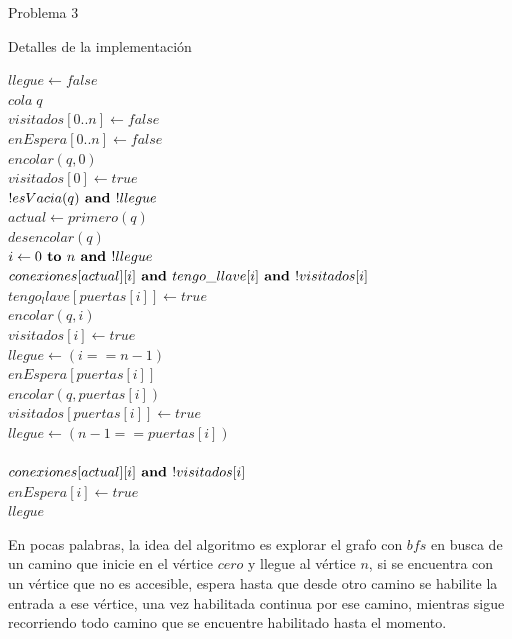 \begin{section}{Problema 3}
\begin{subsection}{Detalles de la implementación}
		\begin{pseudo}
		\tab $llegue \leftarrow false$\\
		\tab $cola\; q$\\
		\tab $visitados[0..n] \leftarrow false$\\ 
		\tab $enEspera[0..n] \leftarrow false$\\ 
		\tab $encolar(q,0)$\\
		\tab $visitados[0] \leftarrow true$\\
		\tab \WHILE $!esVacia(q) \textbf{ and } !llegue$\\
		\tab \tab $actual \leftarrow primero(q)$\\
		\tab \tab $desencolar(q)$\\
		\tab \tab \FOR $ i\leftarrow0 \textbf{ to } n \textbf{ and } !llegue$\\
		\tab \tab \tab \IF	$conexiones[actual][i] \textbf{ and } tengo\_llave[i] \textbf{ and } !visitados[i]$\\
		\tab \tab \tab \tab	$tengo_llave[puertas[i]] \leftarrow true$\\
		\tab \tab \tab \tab	$encolar(q,i)$\\
		\tab \tab \tab \tab	$visitados[i] \leftarrow true$\\
		\tab \tab \tab \tab	$llegue \leftarrow (i == n-1)$\\
		\tab \tab \tab \tab \IF	$enEspera[puertas[i]]$\\
		\tab \tab \tab \tab \tab $encolar(q,puertas[i])$\\
		\tab \tab \tab \tab \tab $visitados[puertas[i]] \leftarrow true$\\
		\tab \tab \tab \tab \tab $llegue \leftarrow (n-1==puertas[i])$\\
		\tab \tab \tab \ELSE \\
		\tab \tab \tab \tab \IF $conexiones[actual][i] \textbf{ and } !visitados[i]$\\
		\tab \tab \tab \tab \tab $enEspera[i] \leftarrow true$\\
		\tab \RET $llegue$\\
		\end{pseudo}

		En pocas palabras, la idea del algoritmo es explorar el grafo con $bfs$ en busca de un camino que inicie en el vértice $cero$ y llegue al vértice $n$, si se encuentra con un vértice que no es accesible, espera hasta que desde otro camino se habilite la entrada a ese vértice, una vez habilitada continua por ese camino, mientras sigue recorriendo todo camino que se encuentre habilitado hasta el momento.


\end{subsection}
\end{section}
